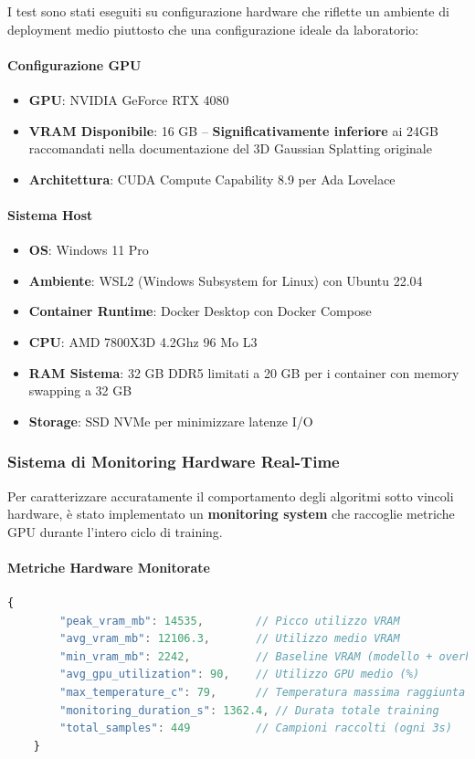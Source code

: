 I test sono stati eseguiti su configurazione hardware che riflette un ambiente di deployment medio piuttosto che una configurazione ideale da laboratorio:

\paragraph{Configurazione GPU}
\begin{itemize}
	\item \textbf{GPU}: NVIDIA GeForce RTX 4080
	\item \textbf{VRAM Disponibile}: 16 GB -- \textbf{Significativamente inferiore} ai 24GB raccomandati nella documentazione del 3D Gaussian Splatting originale
	\item \textbf{Architettura}: CUDA Compute Capability 8.9 per Ada Lovelace
\end{itemize}

\paragraph{Sistema Host}
\begin{itemize}
	\item \textbf{OS}: Windows 11 Pro
	\item \textbf{Ambiente}: WSL2 (Windows Subsystem for Linux) con Ubuntu 22.04
	\item \textbf{Container Runtime}: Docker Desktop con Docker Compose
	\item \textbf{CPU}: AMD 7800X3D 4.2Ghz 96 Mo L3 
	\item \textbf{RAM Sistema}: 32 GB DDR5 limitati a 20 GB per i container con memory swapping a 32 GB
	\item \textbf{Storage}: SSD NVMe per minimizzare latenze I/O
\end{itemize}

\subsubsection{Sistema di Monitoring Hardware Real-Time}
\label{subsubsec:monitoring_hardware}

Per caratterizzare accuratamente il comportamento degli algoritmi sotto vincoli hardware, è stato implementato un \textbf{monitoring system} che raccoglie metriche GPU durante l'intero ciclo di training.

\paragraph{Metriche Hardware Monitorate}
\begin{lstlisting}[language=JavaScript, caption=Esempio statistiche hardware raccolte]
	{
		"peak_vram_mb": 14535,        // Picco utilizzo VRAM
		"avg_vram_mb": 12106.3,       // Utilizzo medio VRAM
		"min_vram_mb": 2242,          // Baseline VRAM (modello + overhead)
		"avg_gpu_utilization": 90,    // Utilizzo GPU medio (%)
		"max_temperature_c": 79,      // Temperatura massima raggiunta
		"monitoring_duration_s": 1362.4, // Durata totale training
		"total_samples": 449          // Campioni raccolti (ogni 3s)
	}
\end{lstlisting}

